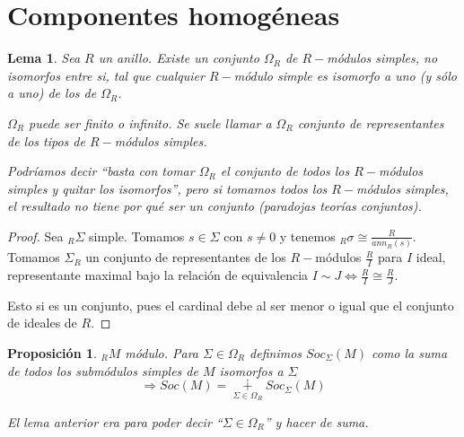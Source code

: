\documentclass[11pt,a4paper]{article}
\theoremstyle{break}
\newtheorem{lemma}[theorem]{Lema}
\newtheorem{proposition}[theorem]{Proposición}
\begin{document}
\newpage

\section{Componentes homogéneas}

\begin{lemma}
Sea $R$ un anillo. Existe un conjunto $\Omega_{R}$ de $R-$módulos simples, no isomorfos entre si, tal que cualquier $R-$módulo simple es isomorfo a uno (y sólo a uno) de los de $\Omega_{R}$.

$\Omega_{R}$ puede ser finito o infinito. Se suele llamar a $\Omega_{R}$ conjunto de representantes de los tipos de $R-$módulos simples.

Podríamos decir ``basta con tomar $\Omega_{R}$ el conjunto de todos los $R-$módulos simples y quitar los isomorfos'', pero si tomamos todos los $R-$módulos simples, el resultado no tiene por qué ser un conjunto (paradojas teorías conjuntos).
\end{lemma}

\begin{proof}
Sea $_{R}\Sigma$ simple. Tomamos $s \in \Sigma$ con $s \neq 0$ y tenemos $_{R}\sigma \cong \frac{R}{ann_{R}(s)}$. Tomamos $\Sigma_{R}$ un conjunto de representantes de los $R-$módulos $\frac{R}{I}$ para $I$ ideal, representante maximal bajo la relación de equivalencia $I \sim J \iff \frac{R}{I} \cong \frac{R}{J}$.

Esto si es un conjunto, pues el cardinal debe al ser menor o igual que el conjunto de ideales de $R$.
\end{proof}

\begin{proposition}
$_{R}M$ módulo. Para $\Sigma \in \Omega_{R}$ definimos $Soc_{\Sigma}(M)$ como la suma de todos los submódulos simples de $M$ isomorfos a $\Sigma$
$$\Rightarrow Soc(M) = \underset{\Sigma \in \Omega_{R}}{\dotplus} Soc_{\Sigma}(M)$$

El lema anterior era para poder decir ``$\Sigma \in \Omega_{R}$'' y hacer de suma.
\end{proposition}
\end{document}
